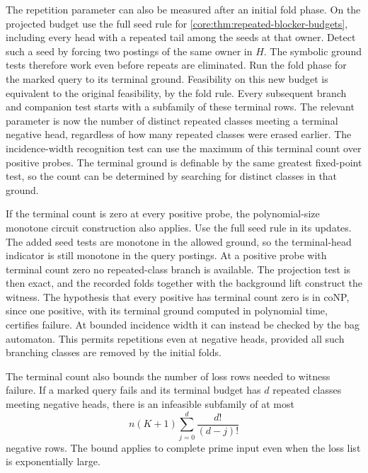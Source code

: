 The repetition parameter can also be measured after an
initial fold phase. On the projected budget use the full
seed rule for \cref{core:thm:repeated-blocker-budgets},
including every head with a repeated tail among the
seeds at that owner. Detect such a seed by forcing two
postings of the same owner in $H$. The symbolic ground
tests therefore work even before repeats are eliminated.
Run the fold phase for the marked query to its terminal
ground. Feasibility on this new budget is equivalent
to the original feasibility, by the fold rule.
Every subsequent branch and companion test starts
with a subfamily of these terminal rows. The relevant
parameter is now the number of distinct repeated
classes meeting a terminal negative head, regardless
of how many repeated classes were erased earlier.
The incidence-width recognition test can use the
maximum of this terminal count over positive probes.
The terminal ground is definable by the same greatest
fixed-point test, so the count can be determined by
searching for distinct classes in that ground.

If the terminal count is zero at every positive probe,
the polynomial-size monotone circuit construction
also applies. Use the full seed rule in its updates.
The added seed tests are monotone in the allowed
ground, so the terminal-head indicator is still
monotone in the query postings. At a positive probe
with terminal count zero no repeated-class branch
is available. The projection test is then exact,
and the recorded folds together with the background
lift construct the witness. The hypothesis that
every positive has terminal count zero is in coNP,
since one positive, with its terminal ground computed
in polynomial time, certifies failure. At bounded
incidence width it can instead be checked by the
bag automaton. This permits repetitions even at
negative heads, provided all such branching classes
are removed by the initial folds.

The terminal count also bounds the number of loss rows
needed to witness failure. If a marked query fails and
its terminal budget has $d$ repeated classes meeting
negative heads, there is an infeasible subfamily of at
most
\[
                 n(K+1)\sum_{j=0}^{d}\frac{d!}{(d-j)!}
\]
negative rows. The bound applies to complete prime
input even when the loss list is exponentially large.

